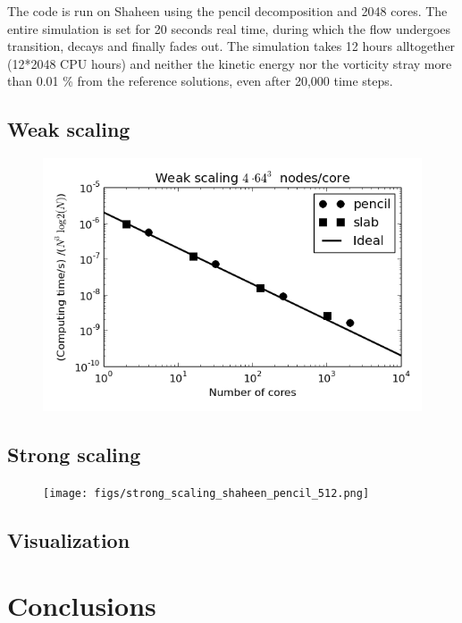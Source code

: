 \documentclass[11pt, oneside]{article}
\begin{document}
The code is run on Shaheen using the pencil decomposition and 2048 cores. The entire simulation is set for 20 seconds real time, during which the flow undergoes transition, decays and finally fades out. The simulation takes 12 hours alltogether (12*2048 CPU hours) and neither the kinetic energy nor the vorticity stray more than 0.01 \% from the reference solutions, even after 20,000 time steps.

\subsection{Weak scaling}

\begin{figure}
\includegraphics[scale=1]{figs/weak_scaling_shaheen.png}
\end{figure}

\subsection{Strong scaling}
\begin{figure}
\texttt{[image: figs/strong\_scaling\_shaheen\_pencil\_512.png]}
\end{figure}

\subsection{Visualization}

\section{Conclusions}


\end{document}
